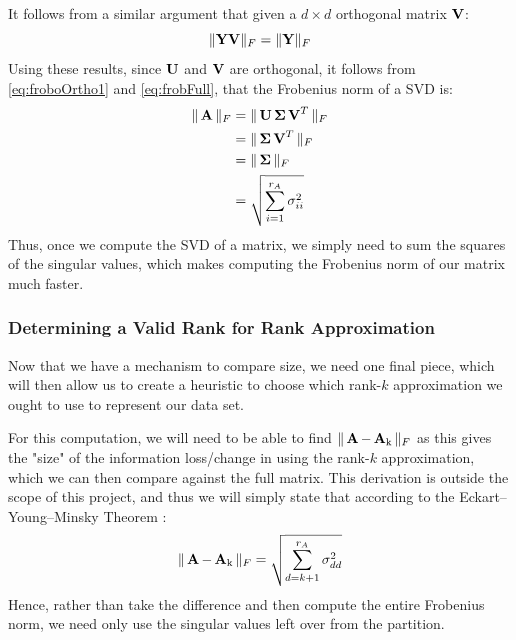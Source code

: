 It follows from a similar argument that given a $ d\times d$ orthogonal matrix $\mathbf{V}$:
\begin{equation} \label{eq:frobFull}
    \|\mathbf{Y}\mathbf{V}\|_F = \|\mathbf{Y}\|_F 
\end{equation}
Using these results, since $\operatorname{\mathbf{U}}$ and $\operatorname{\mathbf{V}}$ are orthogonal, it follows from \autoref{eq:froboOrtho1} and \autoref{eq:frobFull}, that the Frobenius norm of a SVD is:
\begin{equation} \label{eq:froboFinal}
\begin{aligned}
    \|\operatorname{\mathbf{A}}\|_F &= \|\operatorname{\mathbf{U}}\operatorname{\mathbf{\Sigma}}\operatorname{\mathbf{V}}^T\|_F   \\
        &= \|\operatorname{\mathbf{\Sigma}}\operatorname{\mathbf{V}}^T\|_F \\
        &= \|\operatorname{\mathbf{\Sigma}}\|_F \\
        &= \sqrt{\sum_{i=1}^{r_A}\sigma_{ii}^2}
\end{aligned}
\end{equation}
Thus, once we compute the SVD of a matrix, we simply need to sum the squares of the singular values, which makes computing the Frobenius norm of our matrix much faster. 

\subsubsection{Determining a Valid Rank for Rank Approximation}\label{subsubsec:validrank}
Now that we have a mechanism to compare size, we need one final piece, which will then allow us to create a heuristic to choose which rank-$k$ approximation we ought to use to represent our data set. 

For this computation, we will need to be able to find $\|\operatorname{\mathbf{A}}-\operatorname{\mathbf{A}_k}\|_F$  as this gives the "size"
of the information loss/change in using the rank-$k$ approximation, which we can then compare against the full matrix. This derivation is outside the scope of this project, and thus we will simply state that according
to the Eckart–Young–Minsky Theorem \cite{eckartYoung}:
\begin{equation}\label{eq:frobDiff}
    \|\operatorname{\mathbf{A}}-\operatorname{\mathbf{A}_k}\|_F = \sqrt{\sum_{d=k+1}^{r_A}\sigma_{dd}^2}
\end{equation}
Hence, rather than take the difference and then compute the entire Frobenius norm, we need only use the singular values left over from the partition.

